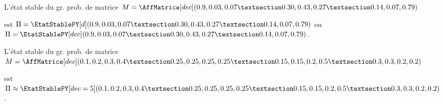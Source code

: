 \documentclass[french,a4paper,10pt]{article}
\begin{document}
\begin{ShowCodeTeX}
L'état stable du gr. prob. de matrice
$M=\AffMatrice[dec](0.9,0.03,0.07 § 0.30,0.43,0.27 § 0.14,0.07,0.79)$

est $\Pi = \EtatStablePY[d](0.9,0.03,0.07 § 0.30,0.43,0.27 § 0.14,0.07,0.79)$
ou $\Pi = \EtatStablePY[dec](0.9,0.03,0.07 § 0.30,0.43,0.27 § 0.14,0.07,0.79)$.
\end{ShowCodeTeX}

\begin{ShowCodeTeX}
L'état stable du gr. prob. de matrice
$M=\AffMatrice[dec](0.1,0.2,0.3,0.4 § 0.25,0.25,0.25,0.25 § 0.15,0.15,0.2,0.5 § 0.3,0.3,0.2,0.2)$

est $\Pi \approx \EtatStablePY[dec=5](0.1,0.2,0.3,0.4 § 0.25,0.25,0.25,0.25 § 0.15,0.15,0.2,0.5 § 0.3,0.3,0.2,0.2)$.
\end{ShowCodeTeX}
\end{document}
